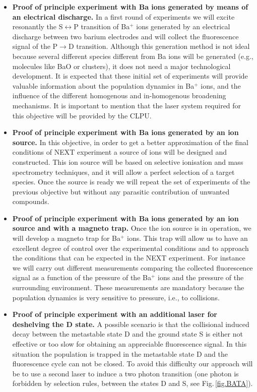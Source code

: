 \begin{itemize}
	\item \textbf{Proof of principle experiment with Ba ions generated by means of an electrical discharge.}
In a first round of experiments we will excite resonantly the S$\leftrightarrow$P transition of Ba$^+$ ions generated by an electrical discharge between two barium electrodes and will collect the fluorescence signal of the P$\rightarrow$D transition. Although this generation method is not ideal because several different species different from Ba ions will be generated (e.g., molecules like BaO or clusters), it does not need a major technological development. It is expected that these initial set of experiments will provide valuable information about the population dynamics in Ba$^+$ ions, and the influence of the different homogenous and in-homogenous broadening mechanisms. It is important to mention that the laser system required for this objective will be provided by the CLPU.
	
	\item \textbf{Proof of principle experiment with Ba ions generated by an ion source.}	
In this objective, in order to get a better approximation of the final conditions of NEXT experiment a source of ions will be designed and constructed. This ion source will be based on selective ionisation and mass spectrometry techniques, and it will allow a perfect selection of a target species. Once the source is ready we will repeat the set of experiments of the previous objective but without any parasitic contribution of unwanted compounds. 
	
	\item \textbf{Proof of principle experiment with Ba ions generated by an ion source and with a magneto trap.}	
Once the ion source is in operation, we will develop a magneto trap for Ba$^+$  ions. This trap will allow us to have an excellent degree of control over the experimental conditions and to approach the conditions that can be expected in the NEXT experiment. For instance we will carry out different measurements comparing the collected fluorescence signal as a function of the pressure of the Ba$^+$ ions and the pressure of the surrounding environment. These measurements are mandatory because the population dynamics is very sensitive to pressure, i.e., to collisions. 
	
	\item \textbf{Proof of principle experiment with an additional laser for deshelving the D state.}
A possible scenario is that the collisional induced decay between the metastable state D and the ground state S is either not effective or too slow for obtaining an appreciable fluorescence signal. In this situation the population is trapped in the metastable state D  and the fluorescence cycle can not be closed. To avoid this difficulty our approach will be to use a second laser to induce a two photon transition (one photon is forbidden by selection rules, between the states D and S, see Fig.\,\ref{fig.BATA}). 


\end{itemize}
